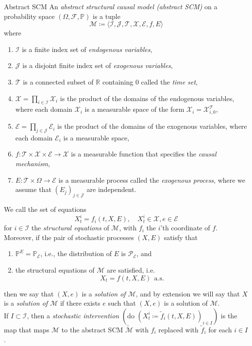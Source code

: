 \documentclass[11pt, a4paper]{memoir}
\theoremstyle{break}
\theoremstyle{break}
\theoremstyle{nonumberplain}
\newcommand{\mR}{\mathbb{R}}
\newcommand{\mP}{\mathbb{P}}
\begin{document}
\begin{mydefinition}{Abstract SCM}
An \emph{abstract structural causal model (abstract SCM)} on a probability space $(\Omega,\mathcal{F},\mP)$ is a tuple
$$\mathcal{M}\coloneqq \langle \mathcal{I},\mathcal{J},\mathcal{T},\mathcal{X},\mathcal{E},f,E\rangle$$
where
\begin{enumerate}[label=(\roman*)]
	\item $\mathcal{I}$ is a finite index set of \emph{endogenous variables},
	\item $\mathcal{J}$ is a disjoint finite index set of \emph{exogenous variables},
	\item $\mathcal{T}$ is a connected subset of $\mR$ containing 0 called the \emph{time set},
	\item $\mathcal{X}=\prod_{i\in \mathcal{I}}\mathcal{X}_i$ is the product of the domains of the endogenous variables, where each domain $\mathcal{X}_i$ is a measurable space of the form $\mathcal{X}_i=\mathcal{X}_{i,0}^{\mathcal{T}}$,
	\item $\mathcal{E}=\prod_{j\in \mathcal{J}}\mathcal{E}_i$ is the product of the domains of the exogenous variables, where each domain $\mathcal{E}_i$ is a measurable space,
	\item $f:\mathcal{T}\times \mathcal{X}\times \mathcal{E}\to\mathcal{X}$ is a measurable function that specifies the \emph{causal mechanism},
	\item $E:\mathcal{T}\times \Omega\to \mathcal{E}$ is a measurable process called the \emph{exogenous process}, where we assume that $(E_j)_{j\in \mathcal{J}}$ are independent.
\end{enumerate}
We call the set of equations
$$X_t^i=f_i(t,X,E),\quad X_t^i\in \mathcal{X},e\in \mathcal{E}$$
for $i\in \mathcal{I}$ the \emph{structural equations} of $\mathcal{M}$, with $f_i$ the $i$'th coordinate of $f$.\\[5pt]
Moreover, if the pair of stochastic processes $(X,E)$ satisfy that
\begin{enumerate}[label=\roman*.]
	\item $\mP^E=\mP_\mathcal{E}$, i.e., the distribution of $E$ is $\mathcal{P}_\mathcal{E}$, and
	\item the structural equations of $\mathcal{M}$ are satisfied, i.e.
	$$X_t=f(t,X,E)\ \ \text{a.s.}$$
\end{enumerate}
then we say that $(X,e)$ is a \emph{solution of $\mathcal{M}$}, and by extension we will say that $X$ is a \emph{solution of $\mathcal{M}$} if there exists $e$ such that $(X,e)$ is a solution of $\mathcal{M}$.\\[5pt]
If  $I\subset \mathcal{I}$, then a \emph{stochastic intervention} $(\text{do } (X_t^i\coloneqq \tilde{f}_i(t,X,E))_{i\in I})$ is the map that maps $\mathcal{M}$ to the abstract SCM $\tilde{\mathcal{M}}$ with $f_i$ replaced with $\tilde{f}_i$ for each $i\in I$.
\end{mydefinition}
\end{document}
